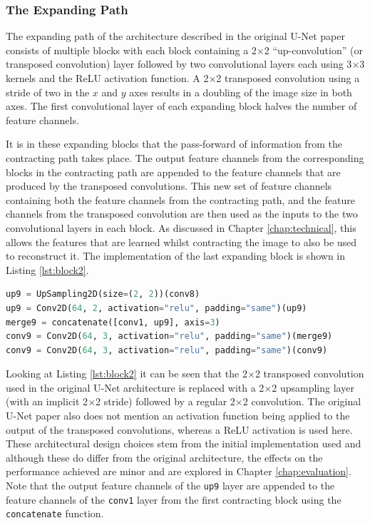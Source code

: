 \subsubsection{The Expanding Path}

The expanding path of the architecture described in the original U-Net paper consists of multiple blocks with each block containing a 2$\times$2 ``up-convolution'' (or transposed convolution) layer followed by two convolutional layers each using 3$\times$3 kernels and the ReLU activation function. A 2$\times$2 transposed convolution using a stride of two in the $x$ and $y$ axes results in a doubling of the image size in both axes. The first convolutional layer of each expanding block halves the number of feature channels.

It is in these expanding blocks that the pass-forward of information from the contracting path takes place. The output feature channels from the corresponding blocks in the contracting path are appended to the feature channels that are produced by the transposed convolutions. This new set of feature channels containing both the feature channels from the contracting path, and the feature channels from the transposed convolution are then used as the inputs to the two convolutional layers in each block. As discussed in Chapter \ref{chap:technical}, this allows the features that are learned whilst contracting the image to also be used to reconstruct it. The implementation of the last expanding block is shown in Listing \ref{lst:block2}.

\begin{lstlisting}[float={!t},caption={The implementation of the last expanding block of the U-Net architecture using the Keras functional API.},label={lst:block2},language=Python,upquote=true,belowskip=0pt]
up9 = UpSampling2D(size=(2, 2))(conv8)
up9 = Conv2D(64, 2, activation="relu", padding="same")(up9)
merge9 = concatenate([conv1, up9], axis=3)
conv9 = Conv2D(64, 3, activation="relu", padding="same")(merge9)
conv9 = Conv2D(64, 3, activation="relu", padding="same")(conv9)
\end{lstlisting}
Looking at Listing \ref{lst:block2} it can be seen that the 2$\times$2 transposed convolution used in the original U-Net architecture is replaced with a 2$\times$2 upsampling layer (with an implicit 2$\times$2 stride) followed by a regular 2$\times$2 convolution. The original U-Net paper also does not mention an activation function being applied to the output of the transposed convolutions, whereas a ReLU activation is used here. These architectural design choices stem from the initial implementation used and although these do differ from the original architecture, the effects on the performance achieved are minor and are explored in Chapter \ref{chap:evaluation}. Note that the output feature channels of the \texttt{up9} layer are appended to the feature channels of the \texttt{conv1} layer from the first contracting block using the \texttt{concatenate} function.

